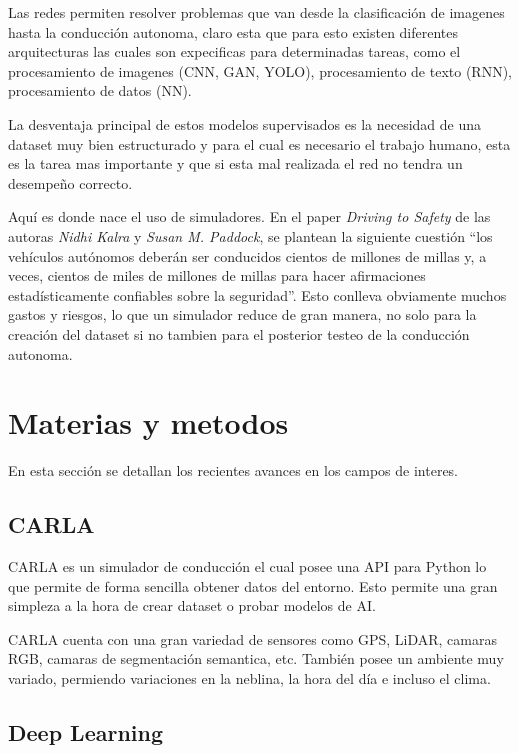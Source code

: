 \documentclass[]{IEEEtran}
\begin{document}
    Las redes permiten resolver problemas que van desde la clasificación de imagenes hasta la conducción autonoma, claro esta 
    que para esto existen diferentes arquitecturas las cuales son expecificas para determinadas tareas, como el procesamiento de imagenes (CNN, GAN, YOLO), 
    procesamiento de texto (RNN), procesamiento de datos (NN).

    La desventaja principal de estos modelos supervisados es la necesidad de una dataset muy bien estructurado y para el cual es necesario 
    el trabajo humano, esta es la tarea mas importante y que si esta mal realizada el red no tendra un desempeño correcto.

    Aquí es donde nace el uso de simuladores. En el paper \textit{Driving to Safety} de las autoras \textit{Nidhi Kalra} y \textit{Susan M. Paddock}, se 
    plantean la siguiente cuestión ``los vehículos autónomos deberán ser conducidos cientos de millones de millas y, a veces, cientos de miles de millones de millas
    para hacer afirmaciones estadísticamente confiables sobre la seguridad''. Esto conlleva obviamente muchos gastos y riesgos, lo que un simulador reduce de gran 
    manera, no solo para la creación del dataset si no tambien para el posterior testeo de la conducción autonoma. 



    \section{Materias y metodos}

    En esta sección se detallan los recientes avances en los campos de interes.


    \subsection{CARLA}

    CARLA \cite{CARLA-Simulator} es un simulador de conducción el cual posee una API para Python lo que 
    permite de forma sencilla obtener datos del entorno. Esto permite una gran simpleza 
    a la hora de crear dataset o probar modelos de AI.
    
    CARLA cuenta con una gran variedad de sensores como GPS, LiDAR, camaras RGB, camaras de segmentación semantica, etc.
    También posee un ambiente muy variado, permiendo variaciones en la neblina, la hora del día e incluso el clima.

    \subsection{Deep Learning}
\end{document}
